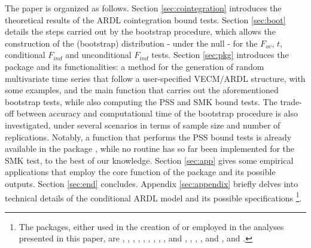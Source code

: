The paper is organized as follows. Section \ref{sec:cointegration} introduces the theoretical results of the ARDL cointegration bound tests. Section \ref{sec:boot} details the steps carried out by the bootstrap procedure, which allows the construction of the (bootstrap) distribution - under the null - for the $F_{ov}$, $t$, conditional $F_{ind}$ and unconditional $F_{ind}$ tests. Section \ref{sec:pkg} introduces the  package  \citep{bootCT} and its functionalities: a method for the generation of random multivariate time series that follow a user-specified VECM/ARDL structure, with some examples, and the main function that carries out the aforementioned bootstrap tests, while also computing the PSS and SMK bound tests. 
The trade-off between accuracy and computational time of the bootstrap procedure is also investigated, under several scenarios in terms of sample size and number of replications. Notably, a function that performs the PSS bound tests is already available in the  package \citep{PKGDYNAMAC}, while no  routine has so far been implemented for the SMK test, to the best of our knowledge.
Section \ref{sec:app} gives some empirical applications that employ the core function of the package and its possible outputs. Section \ref{sec:end} concludes. Appendix \ref{sec:appendix} briefly delves into technical details of the conditional ARDL model and its possible specifications
\footnote{The  packages, either used in the creation of  or employed in the analyses presented in this paper, are  \citep{magrittr},  \citep{gtools},  \citep{pracma},  \citep{RCPP},  \citep{RcppArmadillo2023},  \citep{Rmisc},  \citep{PKGDYNAMAC},  \citep{PKGARDL},  \citep{aod},  and  \citep{PKGVARS, urca},  \citep{PKGATSA},  \citep{tseries}, ,   and  \citep{reshape2,ggplot,stringr},  and  \citep{tidyverse,dplyr}.}.


